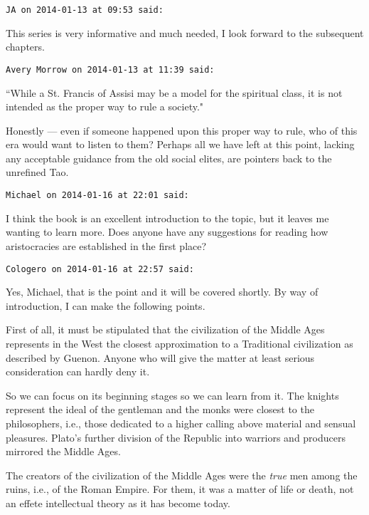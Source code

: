 \begin{footnotesize}\begin{sffamily}



\texttt{JA on 2014-01-13 at 09:53 said: }

This series is very informative and much needed, I look forward to the subsequent chapters.


\hfill

\texttt{Avery Morrow on 2014-01-13 at 11:39 said: }

``While a St. Francis of Assisi may be a model for the spiritual class, it is not intended as the proper way to rule a society."

Honestly — even if someone happened upon this proper way to rule, who of this era would want to listen to them? Perhaps all we have left at this point, lacking any acceptable guidance from the old social elites, are pointers back to the unrefined Tao.


\hfill

\texttt{Michael on 2014-01-16 at 22:01 said: }

I think the book is an excellent introduction to the topic, but it leaves me wanting to learn more. Does anyone have any suggestions for reading how aristocracies are established in the first place?


\hfill

\texttt{Cologero on 2014-01-16 at 22:57 said: }

Yes, Michael, that is the point and it will be covered shortly. By way of introduction, I can make the following points.

First of all, it must be stipulated that the civilization of the Middle Ages represents in the West the closest approximation to a Traditional civilization as described by Guenon. Anyone who will give the matter at least serious consideration can hardly deny it.

So we can focus on its beginning stages so we can learn from it. The knights represent the ideal of the gentleman and the monks were closest to the philosophers, i.e., those dedicated to a higher calling above material and sensual pleasures. Plato's further division of the Republic into warriors and producers mirrored the Middle Ages.

The creators of the civilization of the Middle Ages were the \emph{true} men among the ruins, i.e., of the Roman Empire. For them, it was a matter of life or death, not an effete intellectual theory as it has become today.


\end{sffamily}
\end{footnotesize}
